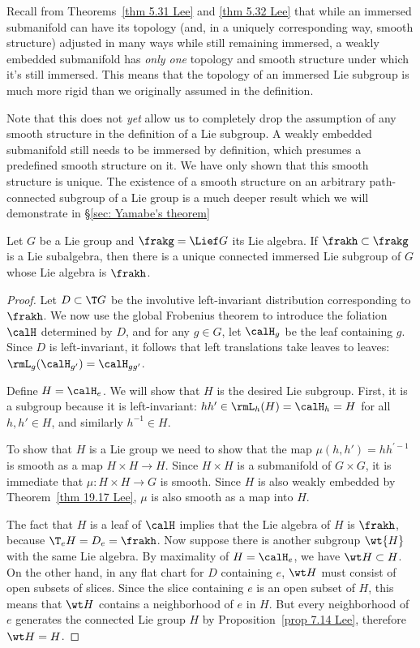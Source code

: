 Recall from Theorems~\ref{thm 5.31 Lee} and \ref{thm 5.32 Lee} that while an immersed submanifold can have its topology (and, in a uniquely corresponding way, smooth structure) adjusted in many ways while still remaining immersed, a weakly embedded submanifold has \emph{only one} topology and smooth structure under which it's still immersed. This means that the topology of an immersed Lie subgroup is much more rigid than we originally assumed in the definition.

\begin{rem}
    Note that this does not \emph{yet} allow us to completely drop the assumption of any smooth structure in the definition of a Lie subgroup. A weakly embedded submanifold still needs to be immersed by definition, which presumes a predefined smooth structure on it. We have only shown that this smooth structure is unique. The existence of a smooth structure on an arbitrary path-connected subgroup of a Lie group is a much deeper result which we will demonstrate in \S\ref{sec: Yamabe's theorem}
\end{rem}

\begin{thm} Let $G$ be a Lie group and $\frakg=\Lief G$ its Lie algebra. If $\frakh\subset \frakg$ is a Lie subalgebra, then there is a unique connected immersed Lie subgroup of $G$ whose Lie algebra is $\frakh$.
\end{thm}
\begin{proof}
    Let $D\subset \T G$ be the involutive left-invariant distribution corresponding to $\frakh$. We now use the global Frobenius theorem to introduce the foliation $\calH$ determined by $D$, and for any $g\in G$, let $\calH_g$ be the leaf containing $g$. Since $D$ is left-invariant, it follows that left translations take leaves to leaves: $\rmL_g(\calH_{g'})=\calH_{gg'}$.

    Define $H=\calH_e$. We will show that $H$ is the desired Lie subgroup. First, it is a subgroup because it is left-invariant: $hh'\in \rmL_h(H)=\calH_h=H$ for all $h,h'\in H$, and similarly $h^{-1}\in H$.

    To show that $H$ is a Lie group we need to show that the map $\mu(h,h')=hh^{\prime -1}$ is smooth as a map $H\times H\to H$. Since $H\times H$ is a submanifold of $G\times G$, it is immediate that $\mu:H\times H\to G$ is smooth. Since $H$ is also weakly embedded by Theorem~\ref{thm 19.17 Lee}, $\mu$ is also smooth as a map into $H$.

    The fact that $H$ is a leaf of $\calH$ implies that the Lie algebra of $H$ is $\frakh$, because $\T_eH=D_e=\frakh$. Now suppose there is another subgroup $\wt{H}$ with the same Lie algebra. By maximality of $H=\calH_e$, we have $\wt H\subset H$. On the other hand, in any flat chart for $D$ containing $e$, $\wt H$ must consist of open subsets of slices. Since the slice containing $e$ is an open subset of $H$, this means that $\wt H$ contains a neighborhood of $e$ in $H$. But every neighborhood of $e$ generates the connected Lie group $H$ by Proposition~\ref{prop 7.14 Lee}, therefore $\wt H=H$.
\end{proof}


